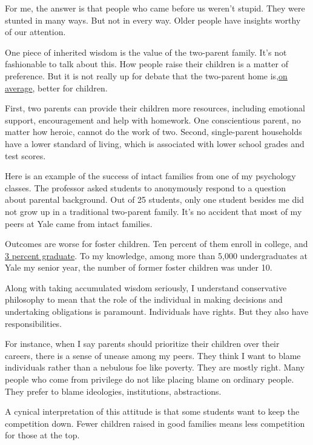 For me, the answer is that people who came before us weren't stupid.
They were stunted in many ways. But not in every way. Older people have
insights worthy of our attention.

One piece of inherited wisdom is the value of the two-parent family.
It's not fashionable to talk about this. How people raise their children
is a matter of preference. But it is not really up for debate that the
two-parent home
is,\href{http://www.nytimes3xbfgragh.onion/2012/07/15/us/two-classes-in-america-divided-by-i-do.html}{on
average}, better for children.

First, two parents can provide their children more resources, including
emotional support, encouragement and help with homework. One
conscientious parent, no matter how heroic, cannot do the work of two.
Second, single-parent households have a lower standard of living, which
is associated with lower school grades and test scores.

Here is an example of the success of intact families from one of my
psychology classes. The professor asked students to anonymously respond
to a question about parental background. Out of 25 students, only one
student besides me did not grow up in a traditional two-parent family.
It's no accident that most of my peers at Yale came from intact
families.

Outcomes are worse for foster children. Ten percent of them enroll in
college, and
\href{https://www.sciencedaily.com/releases/2015/04/150419193908.htm}{3
percent graduate}. To my knowledge, among more than 5,000 undergraduates
at Yale my senior year, the number of former foster children was under
10.

Along with taking accumulated wisdom seriously, I understand
conservative philosophy to mean that the role of the individual in
making decisions and undertaking obligations is paramount. Individuals
have rights. But they also have responsibilities.

For instance, when I say parents should prioritize their children over
their careers, there is a sense of unease among my peers. They think I
want to blame individuals rather than a nebulous foe like poverty. They
are mostly right. Many people who come from privilege do not like
placing blame on ordinary people. They prefer to blame ideologies,
institutions, abstractions.

A cynical interpretation of this attitude is that some students want to
keep the competition down. Fewer children raised in good families means
less competition for those at the top.

